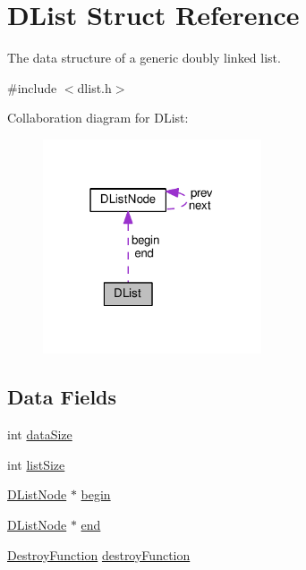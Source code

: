\hypertarget{structDList}{}\section{D\+List Struct Reference}
\label{structDList}


The data structure of a generic doubly linked list.  




{\ttfamily \#include $<$dlist.\+h$>$}



Collaboration diagram for D\+List\+:\nopagebreak
\begin{figure}[H]
\begin{center}
\leavevmode
\includegraphics[width=183pt]{structDList__coll__graph}
\end{center}
\end{figure}
\subsection*{Data Fields}
\begin{DoxyCompactItemize}
\item 
int \hyperlink{structDList_aac5e5498f12e33cdcf9212802b92ded4}{data\+Size}
\item 
int \hyperlink{structDList_a85d2c4c3a5abba8fb8c903571ae72369}{list\+Size}
\item 
\hyperlink{structDListNode}{D\+List\+Node} $\ast$ \hyperlink{structDList_a9f124f116c54de297ae53584cb3a13f6}{begin}
\item 
\hyperlink{structDListNode}{D\+List\+Node} $\ast$ \hyperlink{structDList_ae11ba36cd0e3bdeac4c7189910993864}{end}
\item 
\hyperlink{dlist_8h_a2206207e78cb6335a8f41ad6cf76b55c}{Destroy\+Function} \hyperlink{structDList_a039e1b8cd416fceafdb407c1bc51ae4c}{destroy\+Function}
\end{DoxyCompactItemize}


